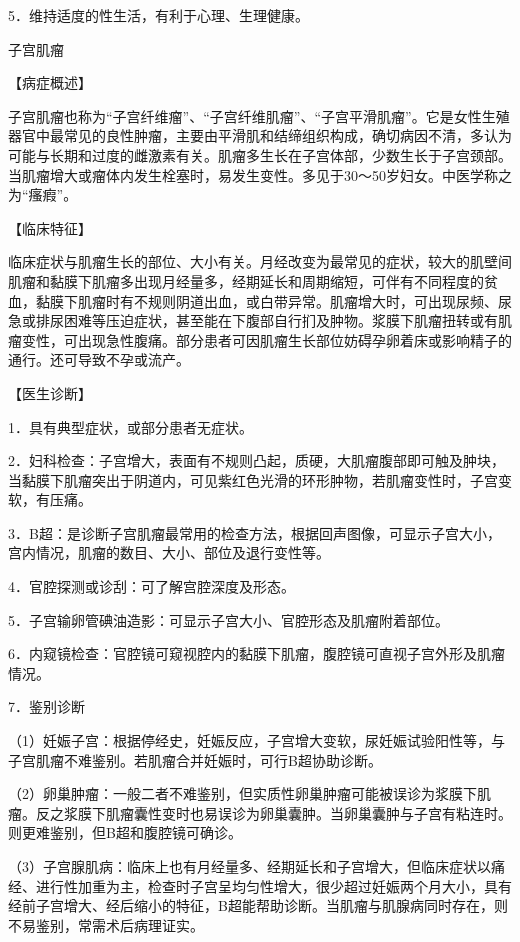 \documentclass[12pt,UTF8]{ctexbook}
\begin{document}
5．维持适度的性生活，有利于心理、生理健康。





子宫肌瘤


【病症概述】

子宫肌瘤也称为“子宫纤维瘤”、“子宫纤维肌瘤”、“子宫平滑肌瘤”。它是女性生殖器官中最常见的良性肿瘤，主要由平滑肌和结缔组织构成，确切病因不清，多认为可能与长期和过度的雌激素有关。肌瘤多生长在子宫体部，少数生长于子宫颈部。当肌瘤增大或瘤体内发生栓塞时，易发生变性。多见于30～50岁妇女。中医学称之为“瘙瘕”。

【临床特征】

临床症状与肌瘤生长的部位、大小有关。月经改变为最常见的症状，较大的肌壁间肌瘤和黏膜下肌瘤多出现月经量多，经期延长和周期缩短，可伴有不同程度的贫血，黏膜下肌瘤时有不规则阴道出血，或白带异常。肌瘤增大时，可出现尿频、尿急或排尿困难等压迫症状，甚至能在下腹部自行扪及肿物。浆膜下肌瘤扭转或有肌瘤变性，可出现急性腹痛。部分患者可因肌瘤生长部位妨碍孕卵着床或影响精子的通行。还可导致不孕或流产。

【医生诊断】

1．具有典型症状，或部分患者无症状。

2．妇科检查：子宫增大，表面有不规则凸起，质硬，大肌瘤腹部即可触及肿块，当黏膜下肌瘤突出于阴道内，可见紫红色光滑的环形肿物，若肌瘤变性时，子宫变软，有压痛。

3．B超：是诊断子宫肌瘤最常用的检查方法，根据回声图像，可显示子宫大小，宫内情况，肌瘤的数目、大小、部位及退行变性等。

4．官腔探测或诊刮：可了解宫腔深度及形态。

5．子宫输卵管碘油造影：可显示子宫大小、官腔形态及肌瘤附着部位。

6．内窥镜检查：官腔镜可窥视腔内的黏膜下肌瘤，腹腔镜可直视子宫外形及肌瘤情况。

7．鉴别诊断

（1）妊娠子宫：根据停经史，妊娠反应，子宫增大变软，尿妊娠试验阳性等，与子宫肌瘤不难鉴别。若肌瘤合并妊娠时，可行B超协助诊断。

（2）卵巢肿瘤：一般二者不难鉴别，但实质性卵巢肿瘤可能被误诊为浆膜下肌瘤。反之浆膜下肌瘤囊性变时也易误诊为卵巢囊肿。当卵巢囊肿与子宫有粘连时。则更难鉴别，但B超和腹腔镜可确诊。

（3）子宫腺肌病：临床上也有月经量多、经期延长和子宫增大，但临床症状以痛经、进行性加重为主，检查时子宫呈均匀性增大，很少超过妊娠两个月大小，具有经前子宫增大、经后缩小的特征，B超能帮助诊断。当肌瘤与肌腺病同时存在，则不易鉴别，常需术后病理证实。
\end{document}
